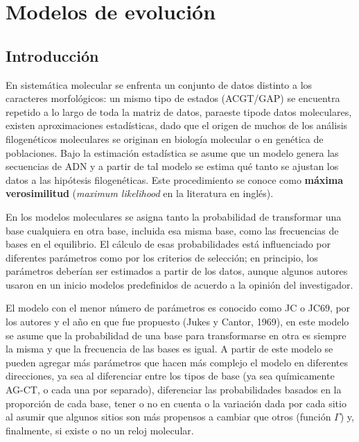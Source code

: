 %
%
\chapter{Modelos de evoluci\'on}
\section*{Introducci\'on}
\label{ch:molecular}
En sistem\'atica molecular se enfrenta un conjunto de datos distinto  a los caracteres morfol\'ogicos:  un mismo tipo de estados (ACGT/GAP) se encuentra repetido a lo largo de toda la matriz de datos, paraeste tipode datos moleculares, existen aproximaciones estad\'isticas, dado que el origen de muchos de los an\'alisis filogen\'eticos moleculares se originan en biolog\'ia molecular o en gen\'etica de poblaciones. Bajo la estimaci\'on estad\'istica se asume que un modelo genera las secuencias de ADN y a partir de tal modelo se estima qu\'e tanto se ajustan los datos a las hip\'otesis filogen\'eticas. Este procedimiento se conoce como \textbf{m\'axima verosimilitud} (\textit{maximum likelihood} en la literatura en ingl\'es).

En los modelos moleculares se asigna tanto la probabilidad de transformar una base cualquiera en otra base, incluida esa misma base, como las frecuencias de bases en el equilibrio. El c\'alculo de esas probabilidades est\'a influenciado por diferentes par\'ametros como por los criterios de selecci\'on; en principio, los par\'ametros deber\'ian ser estimados a partir  de los datos, aunque algunos autores usaron en un inicio modelos predefinidos de acuerdo a la opini\'on del investigador.

El modelo con el menor n\'umero de par\'ametros es conocido como JC o JC69, por los autores y el a\~no en que fue propuesto (Jukes y Cantor, 1969), en este modelo se asume que la probabilidad de una base para transformarse en otra es siempre la misma y que la frecuencia de las bases es igual. A partir de este modelo se pueden agregar m\'as par\'ametros que hacen m\'as complejo el modelo en diferentes direcciones, ya sea al diferenciar entre los tipos de base (ya sea qu\'imicamente AG-CT, o cada una por separado), diferenciar las probabilidades basados en la proporci\'on de cada base, tener o no en cuenta o la variaci\'on dada por cada sitio al asumir que algunos sitios son m\'as propensos a cambiar que otros (funci\'on $\Gamma$) y, finalmente, si existe o no un reloj molecular.

